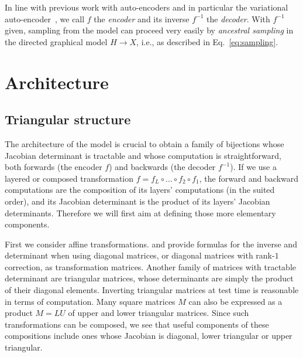 \documentclass{article}
\begin{document}

In line with previous work with auto-encoders and in particular
the variational auto-encoder~\citep{Kingma+Welling-ICLR2014,
Rezende-et-al-arxiv2014,Mnih+Gregor-ICML2014,Gregor-et-al-ICML2014}, 
we call $f$ the {\em encoder} and its inverse $f^{-1}$
the {\em decoder}. With $f^{-1}$ given, sampling from the model can proceed very easily
by {\em ancestral sampling} in the directed graphical model $H \rightarrow X$, i.e.,
as described in Eq.~\ref{eq:sampling}.


\section{Architecture}
\subsection{Triangular structure}
The architecture of the model is crucial to obtain
a family of bijections whose Jacobian determinant is tractable and whose computation
is straightforward, both forwards (the encoder $f$) and backwards (the decoder $f^{-1}$).
If we use a layered or composed transformation $f = f_L \circ \ldots \circ f_2 \circ f_1$, the
forward and backward computations are the composition of its layers' computations (in the suited order),
and its Jacobian determinant
is the product of
its layers' Jacobian determinants. Therefore we will first aim at
defining those more elementary components.

First we consider affine transformations.
\citep{Rezende-et-al-arxiv2014} and \citep{Kingma+Welling-ICLR2014} provide
formulas for the inverse and determinant when using diagonal matrices, or diagonal
matrices with rank-$1$ correction, as transformation matrices. Another
family of matrices with tractable determinant are triangular
matrices, whose determinants are simply the product of their
diagonal elements. Inverting triangular matrices at test time is 
reasonable in terms of computation. %
Many square matrices $M$ can also be expressed as a product $M = LU$ of upper
and lower triangular matrices. Since such transformations can be composed,
we see that useful components of these compositions include ones whose
Jacobian is diagonal, lower triangular or upper triangular.
\end{document}
